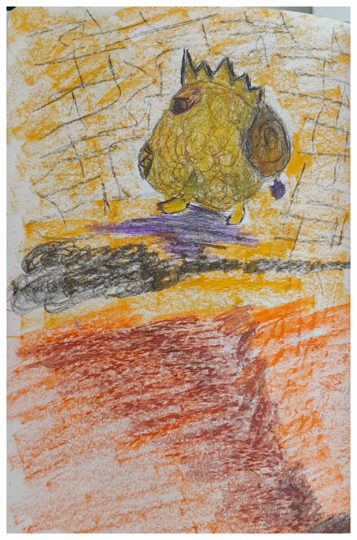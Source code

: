 \documentclass[12pt, a4paper, twoside]{book} %
\begin{document}
\begin{figure}[H]
	\centering
	\includegraphics[width=\textwidth]{./images/1f81324ddf04ba.jpg}
\end{figure}
\end{document}
